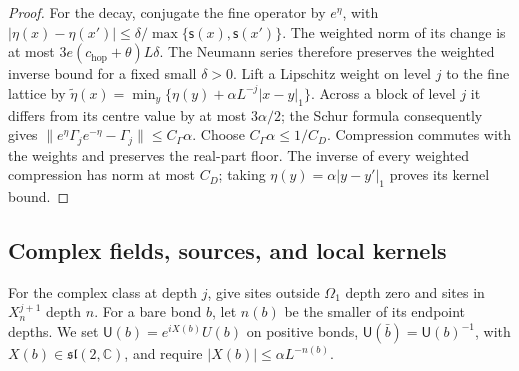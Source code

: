 \documentclass[11pt,letterpaper,reqno]{amsart}
\theoremstyle{definition}
\theoremstyle{remark}
\begin{document}
\begin{proof}
For the decay, conjugate the fine operator by $e^\eta$, with
$|\eta(x)-\eta(x')|\le\delta/\max\{\mathsf s(x),\mathsf s(x')\}$.
The weighted norm of its change is at most
$3e(c_{\mathrm{hop}}+\theta)L\delta$.
The Neumann series therefore preserves the weighted inverse bound
for a fixed small $\delta>0$.  Lift a Lipschitz weight on level
$j$ to the fine lattice by
$\tilde\eta(x)=\min_y\{\eta(y)+\alpha L^{-j}|x-y|_1\}$.
Across a block of level $j$ it differs from its centre value by
at most $3\alpha/2$; the Schur formula consequently gives
$\|e^\eta\Gamma_je^{-\eta}-\Gamma_j\|\le C_\Gamma\alpha$.
Choose $C_\Gamma\alpha\le1/C_D$.
Compression commutes with the weights and preserves the real-part
floor.  The inverse of every weighted compression has norm at most
$C_D$; taking $\eta(y)=\alpha|y-y'|_1$ proves its kernel bound.
\end{proof}

\subsection{Complex fields, sources, and local kernels}

For the complex class at depth $j$, give sites outside $\Omega_1$
depth zero and sites in $X_n^{j+1}$ depth $n$.
For a bare bond $b$, let $n(b)$ be the smaller of its endpoint
depths. We set $\mathsf U(b)=e^{iX(b)}U(b)$ on positive bonds,
$\mathsf U(\bar b)=\mathsf U(b)^{-1}$, with
$X(b)\in\mathfrak{sl}(2,\mathbb C)$, and require
$|X(b)|\le\alpha L^{-n(b)}$.
\end{document}
